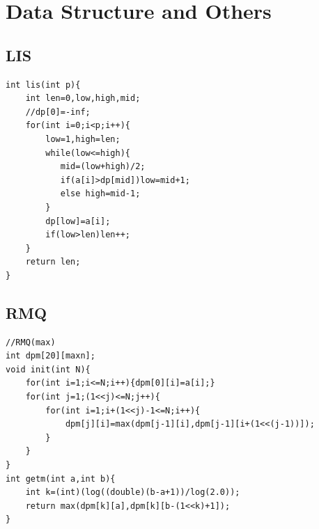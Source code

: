 \documentclass[twocolumn]{article}
\begin{document}
\begin{twocolumn}
\begin{lstlisting}[language={[ANSI]C}]

\end{lstlisting}

\begin{lstlisting}[language={[ANSI]C}]

\end{lstlisting}

\begin{lstlisting}[language={[ANSI]C}]

\end{lstlisting}
\begin{lstlisting}[language={[ANSI]C}]
\end{lstlisting}
\begin{lstlisting}[language={[ANSI]C}]
\end{lstlisting}
\begin{lstlisting}[language={[ANSI]C}]
\end{lstlisting}
\begin{lstlisting}[language={[ANSI]C}]
\end{lstlisting}

\newpage
\section{Data Structure and Others}

\subsection{LIS}
\begin{lstlisting}[language={[ANSI]C}]
int lis(int p){
    int len=0,low,high,mid;
    //dp[0]=-inf;
    for(int i=0;i<p;i++){
        low=1,high=len;
        while(low<=high){
           mid=(low+high)/2;
           if(a[i]>dp[mid])low=mid+1;
           else high=mid-1;
        }
        dp[low]=a[i];
        if(low>len)len++;
    }
    return len;
}
\end{lstlisting}

\subsection{RMQ}
\begin{lstlisting}[language={[ANSI]C}]
//RMQ(max)
int dpm[20][maxn];
void init(int N){
    for(int i=1;i<=N;i++){dpm[0][i]=a[i];}
    for(int j=1;(1<<j)<=N;j++){
        for(int i=1;i+(1<<j)-1<=N;i++){
            dpm[j][i]=max(dpm[j-1][i],dpm[j-1][i+(1<<(j-1))]);
        }
    }
}
int getm(int a,int b){
    int k=(int)(log((double)(b-a+1))/log(2.0));
    return max(dpm[k][a],dpm[k][b-(1<<k)+1]);
}
\end{lstlisting}


\end{twocolumn}
\end{document}
